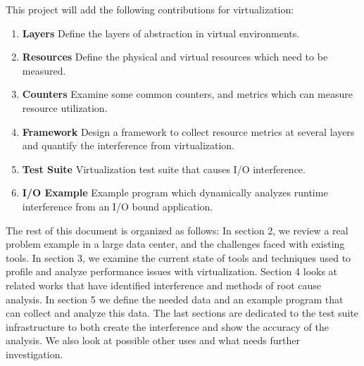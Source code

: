 \indent This project will add the following contributions for virtualization:
\begin{enumerate}
\item \textbf{Layers} Define the layers of abstraction in virtual environments.
\item \textbf{Resources} Define the physical and virtual resources which need to be measured.
\item \textbf{Counters} Examine some common counters, and metrics which can measure resource utilization.
\item \textbf{Framework} Design a framework to collect resource metrics at several layers and quantify the interference from virtualization.
\item \textbf{Test Suite} Virtualization test suite that causes I/O interference.
\item \textbf{I/O Example} Example program which dynamically analyzes runtime interference from an I/O bound application.
\end{enumerate}

\indent The rest of this document is organized as follows:  In section 2, we review a real problem example in a large data center, and the challenges faced with existing tools.  In section 3, we examine the current state of tools and techniques used to profile and analyze performance issues with virtualization.  Section 4 looks at related works that have identified interference and methods of root cause analysis.  In section 5 we define the needed data and an example program that can collect and analyze this data.  The last sections are dedicated to the test suite infrastructure to both create the interference and show the accuracy of the analysis.  We also look at possible other uses and what needs further investigation.
